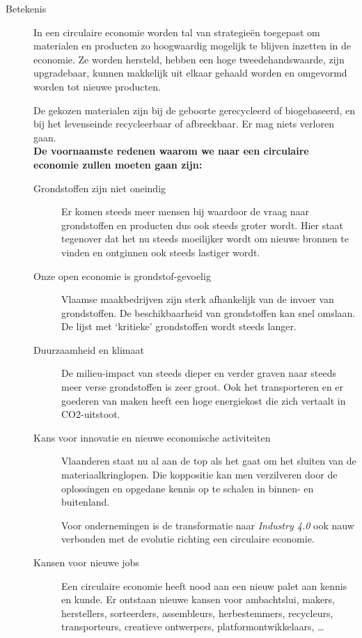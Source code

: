 \documentclass[11pt,a4paper,twoside]{article} %
\begin{document}
\begin{description}
	\item [Betekenis] \cite{circulair} In een circulaire economie worden tal van strategieën toegepast om materialen en producten zo hoogwaardig mogelijk te blijven inzetten in de economie. Ze worden hersteld, hebben een hoge tweedehandswaarde, zijn upgradebaar, kunnen makkelijk uit elkaar gehaald worden en omgevormd worden tot nieuwe producten.
	
	De gekozen materialen zijn bij de geboorte gerecycleerd of biogebaseerd, en bij het levenseinde recycleerbaar of afbreekbaar. Er mag niets verloren gaan.\\

	\textbf{De voornaamste redenen waarom we naar een circulaire economie zullen moeten gaan zijn:}
	\begin{description}
		\item [Grondstoffen zijn niet oneindig] Er komen steeds meer mensen bij waardoor de vraag naar grondstoffen en producten dus ook steeds groter wordt. Hier staat tegenover dat het nu steeds moeilijker wordt om nieuwe bronnen te vinden en ontginnen ook steeds lastiger wordt.

		\item [Onze open economie is grondstof-gevoelig] Vlaamse maakbedrijven zijn sterk afhankelijk van de invoer van grondstoffen. De beschikbaarheid van grondstoffen kan snel omslaan. De lijst met `kritieke' grondstoffen wordt steeds langer.

		\item [Duurzaamheid en klimaat] De milieu-impact van steeds dieper en verder graven naar steeds meer verse grondstoffen is zeer groot. Ook het transporteren en er goederen van maken heeft een hoge energiekost die zich vertaalt in CO2-uitstoot.

		\item [Kans voor innovatie en nieuwe economische activiteiten] Vlaanderen staat nu al aan de top als het gaat om het sluiten van de materiaalkringlopen. Die koppositie kan men verzilveren door de oplossingen en opgedane kennis op te schalen in binnen- en buitenland. 
		
		Voor ondernemingen is de transformatie naar \textit{Industry 4.0} ook nauw verbonden met de evolutie richting een circulaire economie.

		\item [Kansen voor nieuwe jobs] Een circulaire economie heeft nood aan een nieuw palet aan kennis en kunde. Er ontstaan nieuwe kansen voor ambachtslui, makers, herstellers, sorteerders, assembleurs, herbestemmers, recycleurs, transporteurs, creatieve ontwerpers, platformontwikkelaars, \dots
	\end{description}


\end{description}
\end{document}
